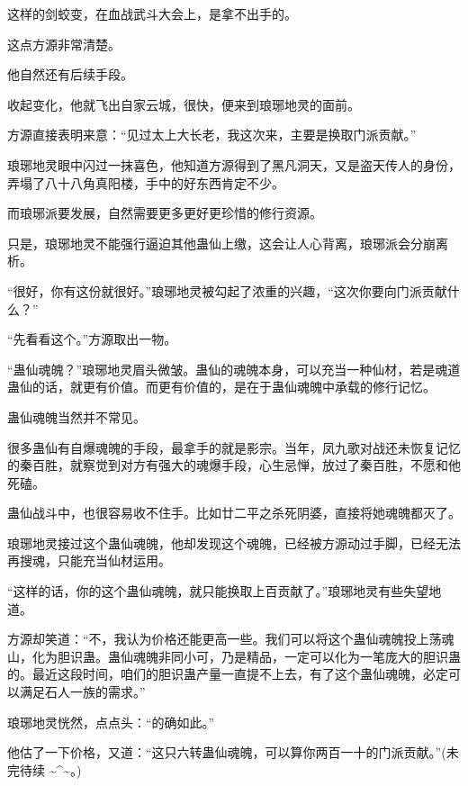 \begin{this_body}
这样的剑蛟变，在血战武斗大会上，是拿不出手的。

这点方源非常清楚。

他自然还有后续手段。

收起变化，他就飞出自家云城，很快，便来到琅琊地灵的面前。

方源直接表明来意：“见过太上大长老，我这次来，主要是换取门派贡献。”

琅琊地灵眼中闪过一抹喜色，他知道方源得到了黑凡洞天，又是盗天传人的身份，弄塌了八十八角真阳楼，手中的好东西肯定不少。

而琅琊派要发展，自然需要更多更好更珍惜的修行资源。

只是，琅琊地灵不能强行逼迫其他蛊仙上缴，这会让人心背离，琅琊派会分崩离析。

“很好，你有这份就很好。”琅琊地灵被勾起了浓重的兴趣，“这次你要向门派贡献什么？”

“先看看这个。”方源取出一物。

“蛊仙魂魄？”琅琊地灵眉头微皱。蛊仙的魂魄本身，可以充当一种仙材，若是魂道蛊仙的话，就更有价值。而更有价值的，是在于蛊仙魂魄中承载的修行记忆。

蛊仙魂魄当然并不常见。

很多蛊仙有自爆魂魄的手段，最拿手的就是影宗。当年，凤九歌对战还未恢复记忆的秦百胜，就察觉到对方有强大的魂爆手段，心生忌惮，放过了秦百胜，不愿和他死磕。

蛊仙战斗中，也很容易收不住手。比如廿二平之杀死阴婆，直接将她魂魄都灭了。

琅琊地灵接过这个蛊仙魂魄，他却发现这个魂魄，已经被方源动过手脚，已经无法再搜魂，只能充当仙材运用。

“这样的话，你的这个蛊仙魂魄，就只能换取上百贡献了。”琅琊地灵有些失望地道。

方源却笑道：“不，我认为价格还能更高一些。我们可以将这个蛊仙魂魄投上荡魂山，化为胆识蛊。蛊仙魂魄非同小可，乃是精品，一定可以化为一笔庞大的胆识蛊的。最近这段时间，咱们的胆识蛊产量一直提不上去，有了这个蛊仙魂魄，必定可以满足石人一族的需求。”

琅琊地灵恍然，点点头：“的确如此。”

他估了一下价格，又道：“这只六转蛊仙魂魄，可以算你两百一十的门派贡献。”(未完待续 \~{}\^{}\~{}。)

\end{this_body}

